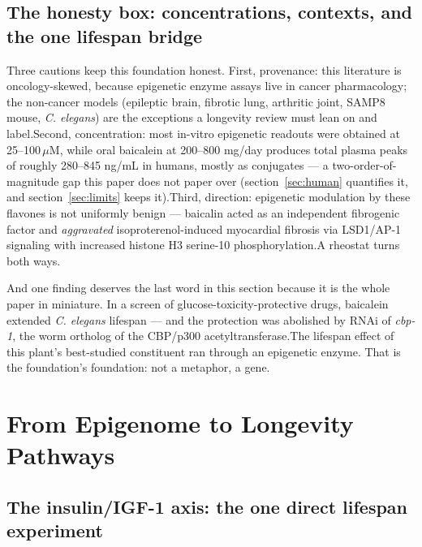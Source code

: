 \documentclass[11pt]{article}
\newcommand{\src}[1]{\allowbreak[#1]}
\begin{document}
\subsection{The honesty box: concentrations, contexts, and the one lifespan bridge}

Three cautions keep this foundation honest. First, provenance: this literature is oncology-skewed, because epigenetic enzyme assays live in cancer pharmacology; the non-cancer models (epileptic brain, fibrotic lung, arthritic joint, SAMP8 mouse, \textit{C. elegans}) are the exceptions a longevity review must lean on and label.\src{154}\src{124}\src{212} Second, concentration: most in-vitro epigenetic readouts were obtained at 25--100\,$\mu$M, while oral baicalein at 200--800 mg/day produces total plasma peaks of roughly 280--845 ng/mL in humans, mostly as conjugates --- a two-order-of-magnitude gap this paper does not paper over (section~\ref{sec:human} quantifies it, and section~\ref{sec:limits} keeps it).\src{37} Third, direction: epigenetic modulation by these flavones is not uniformly benign --- baicalin acted as an independent fibrogenic factor and \emph{aggravated} isoproterenol-induced myocardial fibrosis via LSD1/AP-1 signaling with increased histone H3 serine-10 phosphorylation.\src{160} A rheostat turns both ways.

And one finding deserves the last word in this section because it is the whole paper in miniature. In a screen of glucose-toxicity-protective drugs, baicalein extended \textit{C. elegans} lifespan --- and the protection was abolished by RNAi of \textit{cbp-1}, the worm ortholog of the CBP/p300 acetyltransferase.\src{109} The lifespan effect of this plant's best-studied constituent ran through an epigenetic enzyme. That is the foundation's foundation: not a metaphor, a gene.

\section{From Epigenome to Longevity Pathways}
\label{sec:pathways}

\subsection{The insulin/IGF-1 axis: the one direct lifespan experiment}
\end{document}
